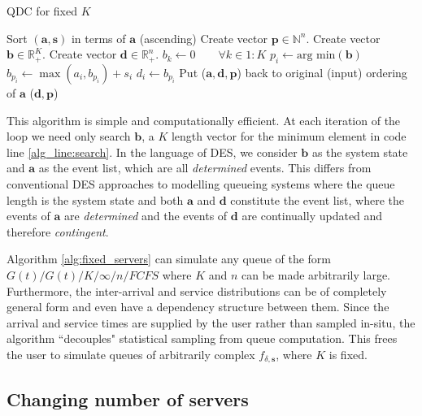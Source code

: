 \documentclass[article]{jss}
\begin{document}
\begin{algorithm}[ht!]
\caption{QDC for fixed $K$}
\label{alg:fixed_servers}
\begin{algorithmic}[1]
\State Sort $(\mathbf{a}, \mathbf{s})$ in terms of $\mathbf{a}$ (ascending)
\State Create vector $\mathbf{p} \in \mathbb{N}^{n}$.
\State Create vector $\mathbf{b} \in \mathbb{R}_{+}^{K}$. 
\State Create vector $\mathbf{d} \in \mathbb{R}_{+}^{n}$.
\State $b_k \leftarrow 0 \quad \quad \forall k \in 1:K $
  \State $p_i \leftarrow \text{arg min}(\mathbf{b}) $ \label{alg_line:search}
  \State $b_{p_i} \leftarrow \max(a_i, b_{p_i}) + s_i $
  \State $d_i \leftarrow b_{p_i}$ 
\EndFor 
\State Put ($\mathbf{a}, \mathbf{d}, \mathbf{p}$) back to original (input) ordering of $\mathbf{a}$ 
\State \Return ($\mathbf{d}, \mathbf{p}$)
\EndFunction
\end{algorithmic}
\end{algorithm}

This algorithm is simple and computationally efficient. At each iteration of the loop we need only search $\mathbf{b}$, a $K$ length vector for the minimum element in code line \ref{alg_line:search}. In the language of DES, we consider $\mathbf{b}$ as the system state and $\mathbf{a}$ as the event list, which are all \textit{determined} events. This differs from conventional DES approaches to modelling queueing systems where the queue length is the system state and both $\mathbf{a}$ and $\mathbf{d}$ constitute the event list, where the events of $\mathbf{a}$ are \textit{determined} and the events of $\mathbf{d}$ are continually updated and therefore \textit{contingent}.  

Algorithm \ref{alg:fixed_servers} can simulate any queue of the form $G(t)/G(t)/K/\infty/n/FCFS$ where $K$ and $n$ can be made arbitrarily large. Furthermore, the inter-arrival and service distributions can be of completely general form and even have a dependency structure between them. Since the arrival and service times are supplied by the user rather than sampled in-situ, the algorithm ``decouples" statistical sampling from queue computation. This frees the user to simulate queues of arbitrarily complex $f_{\delta, \mathbf{s}}$, where $K$ is fixed. 

\subsection{Changing number of servers}
\end{document}
